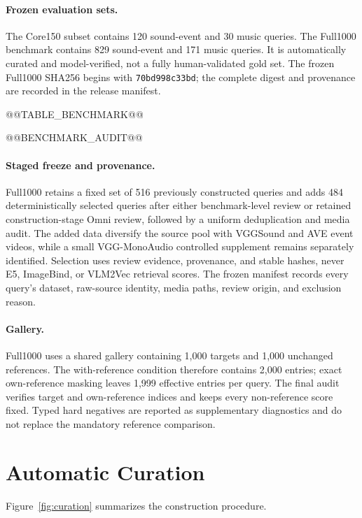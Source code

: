 \documentclass[letterpaper]{article}
\begin{document}
\paragraph{Frozen evaluation sets.}
The Core150 subset contains 120 sound-event and 30 music queries.
The Full1000 benchmark contains 829 sound-event and 171 music queries.
It is automatically curated and model-verified, not a fully human-validated gold set.
The frozen Full1000 SHA256 begins with \texttt{70bd998c33bd}; the complete
digest and provenance are recorded in the release manifest.

@@TABLE_BENCHMARK@@

@@BENCHMARK_AUDIT@@

\paragraph{Staged freeze and provenance.}
Full1000 retains a fixed set of 516 previously constructed queries and adds 484 deterministically selected queries after either benchmark-level review or retained construction-stage Omni review, followed by a uniform deduplication and media audit.
The added data diversify the source pool with VGGSound \cite{chen2020vggsound} and AVE \cite{tian2018ave} event videos, while a small VGG-MonoAudio controlled supplement remains separately identified.
Selection uses review evidence, provenance, and stable hashes, never E5, ImageBind, or VLM2Vec retrieval scores.
The frozen manifest records every query's dataset, raw-source identity, media paths, review origin, and exclusion reason.

\paragraph{Gallery.}
Full1000 uses a shared gallery containing 1,000 targets and 1,000 unchanged references.
The with-reference condition therefore contains 2,000 entries; exact own-reference masking leaves 1,999 effective entries per query.
The final audit verifies target and own-reference indices and keeps every non-reference score fixed.
Typed hard negatives are reported as supplementary diagnostics and do not replace the mandatory reference comparison.

\section{Automatic Curation}

Figure~\ref{fig:curation} summarizes the construction procedure.
\end{document}
